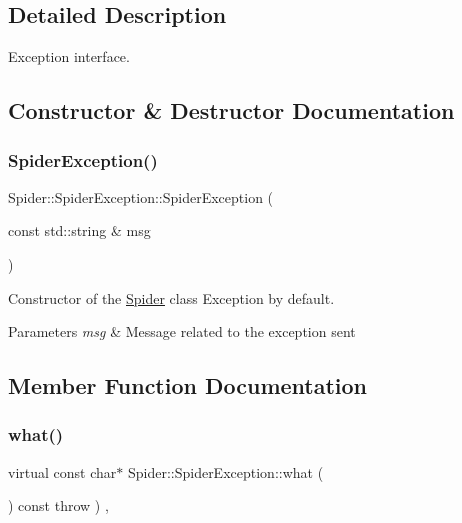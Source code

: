 \subsection{Detailed Description}
Exception interface. 

\subsection{Constructor \& Destructor Documentation}
\mbox{\label{class_spider_1_1_spider_exception_a00b8eddad95f7872a6d30b5ab11cf3cc}} 
\subsubsection{\texorpdfstring{Spider\+Exception()}{SpiderException()}}
{\footnotesize\ttfamily Spider\+::\+Spider\+Exception\+::\+Spider\+Exception (\begin{DoxyParamCaption}\item[{const std\+::string \&}]{msg }\end{DoxyParamCaption})\hspace{0.3cm}{\ttfamily [inline]}}



Constructor of the \hyperlink{namespace_spider}{Spider} class Exception by default. 


\begin{DoxyParams}{Parameters}
{\em msg} & Message related to the exception sent \\
\hline
\end{DoxyParams}


\subsection{Member Function Documentation}
\mbox{\label{class_spider_1_1_spider_exception_aa36edba94a51dc5fb53d54cc98931b2e}} 
\subsubsection{\texorpdfstring{what()}{what()}}
{\footnotesize\ttfamily virtual const char$\ast$ Spider\+::\+Spider\+Exception\+::what (\begin{DoxyParamCaption}{ }\end{DoxyParamCaption}) const throw  ) \hspace{0.3cm}{\ttfamily [inline]}, {\ttfamily [virtual]}}



